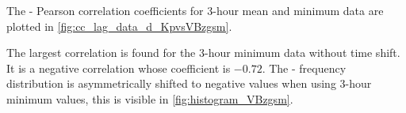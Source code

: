 The \Kp{}-\vBz{} Pearson correlation coefficients for 3-hour mean and minimum data are plotted in \autoref{fig:cc_lag_data_d_KpvsVBzgsm}.
\begin{figure}[htb]
	\begin{floatrow}
	\end{floatrow}
\end{figure}
The largest correlation is found for the 3-hour minimum data without time shift. It is a negative correlation whose coefficient is $-0.72$. The \Kp{}-\vBz{} frequency distribution is asymmetrically shifted to negative values when using 3-hour minimum values, this is visible in \autoref{fig:histogram_VBzgsm}.


